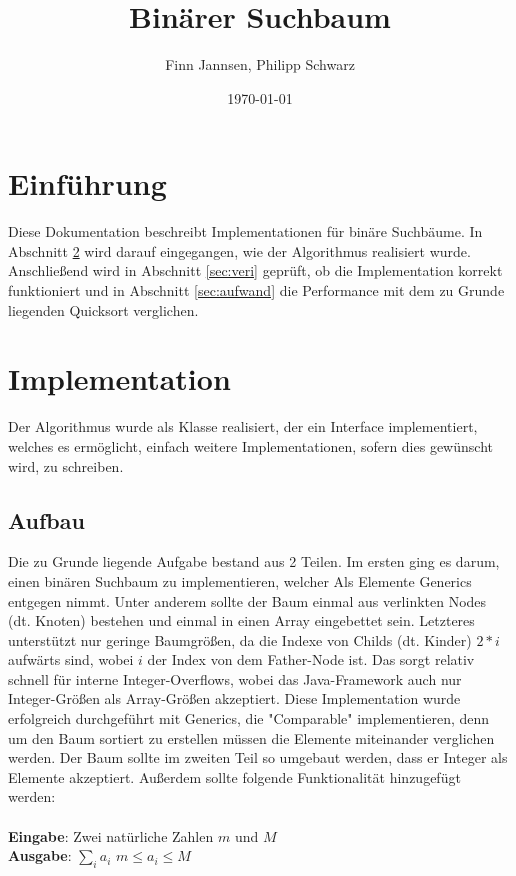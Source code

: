 \documentclass[11pt]{scrartcl}
\title{Binärer Suchbaum}
\author{Finn Jannsen, Philipp Schwarz}
\date{\today{}}
\begin{document}
\maketitle

\tableofcontents

\section{Einführung}
	\label{sec:einfuehrung}
	
	Diese Dokumentation beschreibt Implementationen für binäre Suchbäume.
	In Abschnitt \ref{sec:implementation} wird darauf eingegangen, wie der Algorithmus realisiert wurde.
	Anschließend wird in Abschnitt \ref{sec:veri} geprüft, ob die Implementation korrekt funktioniert 
	und in Abschnitt \ref{sec:aufwand} die Performance mit dem zu Grunde liegenden Quicksort verglichen.

\section{Implementation}
	\label{sec:implementation}
	
	Der Algorithmus wurde als Klasse realisiert, der ein Interface implementiert, welches es ermöglicht, einfach weitere Implementationen, sofern dies gewünscht wird, zu schreiben.
	
	\subsection{Aufbau}
		\label{sec:codeStruc}
		
		Die zu Grunde liegende Aufgabe bestand aus 2 Teilen. Im ersten ging es darum, einen binären Suchbaum zu implementieren, welcher Als Elemente Generics entgegen nimmt.
		Unter anderem sollte der Baum einmal aus verlinkten Nodes (dt. Knoten) bestehen und einmal in einen Array eingebettet sein. Letzteres unterstützt nur geringe Baumgrößen, da die Indexe von Childs (dt. Kinder) $2*i$ aufwärts sind, wobei $i$ der Index von dem Father-Node ist. 
		Das sorgt relativ schnell für interne Integer-Overflows, wobei das Java-Framework auch nur Integer-Größen als Array-Größen akzeptiert.
		Diese Implementation wurde erfolgreich durchgeführt mit Generics, die "Comparable" implementieren, denn um den Baum sortiert zu erstellen müssen die Elemente miteinander verglichen werden.
		Der Baum sollte im zweiten Teil so umgebaut werden, dass er Integer als Elemente akzeptiert. Außerdem sollte folgende Funktionalität hinzugefügt werden:\\\\
		\textbf{Eingabe}: Zwei natürliche Zahlen $m$ und $M$\\
		\textbf{Ausgabe}: $\sum_{i}a_i$ $m \leq a_i \leq M$\\
\end{document}
